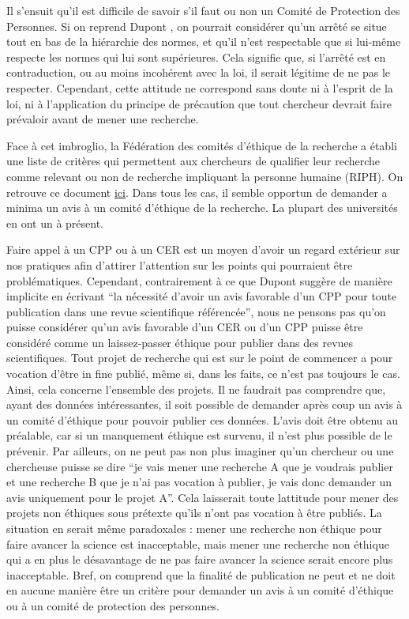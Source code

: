 \documentclass[
  12pt,
]{book}
\begin{document}
Il s'ensuit qu'il est difficile de savoir s'il faut ou non un Comité de Protection des Personnes. Si on reprend Dupont \citeyearpar{Dupont2019}, on pourrait considérer qu'un arrêté se situe tout en bas de la hiérarchie des normes, et qu'il n'est respectable que si lui-même respecte les normes qui lui sont supérieures. Cela signifie que, si l'arrêté est en contraduction, ou au moins incohérent avec la loi, il serait légitime de ne pas le respecter. Cependant, cette attitude ne correspond sans doute ni à l'esprit de la loi, ni à l'application du principe de précaution que tout chercheur devrait faire prévaloir avant de mener une recherche.

Face à cet imbroglio, la Fédération des comités d'éthique de la recherche a établi une liste de critères qui permettent aux chercheurs de qualifier leur recherche comme relevant ou non de recherche impliquant la personne humaine (RIPH). On retrouve ce document \href{https://www.federation-cer.fr/media-files/28420/questionnaire-pour-auto-qualification_9-juin-2020_doc-2.docx}{ici}. Dans tous les cas, il semble opportun de demander a minima un avis à un comité d'éthique de la recherche. La plupart des universités en ont un à présent.

Faire appel à un CPP ou à un CER est un moyen d'avoir un regard extérieur sur nos pratiques afin d'attirer l'attention sur les points qui pourraient être problématiques. Cependant, contrairement à ce que Dupont \citeyearpar{Dupont2019} suggère de manière implicite en écrivant ``la nécessité d'avoir un avis favorable d'un CPP pour toute publication dans une revue scientifique référencée'', nous ne pensons pas qu'on puisse considérer qu'un avis favorable d'un CER ou d'un CPP puisse être considéré comme un laissez-passer éthique pour publier dans des revues scientifiques.
Tout projet de recherche qui est sur le point de commencer a pour vocation d'être in fine publié, même si, dans les faits, ce n'est pas toujours le cas. Ainsi, cela concerne l'ensemble des projets. Il ne faudrait pas comprendre que, ayant des données intéressantes, il soit possible de demander après coup un avis à un comité d'éthique pour pouvoir publier ces données. L'avis doit être obtenu au préalable, car si un manquement éthique est survenu, il n'est plus possible de le prévenir. Par ailleurs, on ne peut pas non plus imaginer qu'un chercheur ou une chercheuse puisse se dire ``je vais mener une recherche A que je voudrais publier et une recherche B que je n'ai pas vocation à publier, je vais donc demander un avis uniquement pour le projet A''. Cela laisserait toute lattitude pour mener des projets non éthiques sous prétexte qu'ils n'ont pas vocation à être publiés. La situation en serait même paradoxales : mener une recherche non éthique pour faire avancer la science est inacceptable, mais mener une recherche non éthique qui a en plus le désavantage de ne pas faire avancer la science serait encore plus inacceptable. Bref, on comprend que la finalité de publication ne peut et ne doit en aucune manière être un critère pour demander un avis à un comité d'éthique ou à un comité de protection des personnes.
\end{document}
